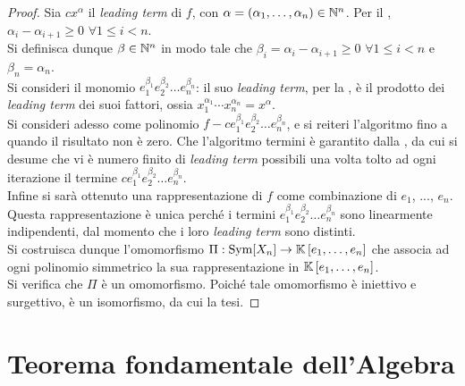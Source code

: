 \begin{proof}
    Sia $c x^\alpha$ il \textit{leading term} di $f$, con
    $\alpha = (\alpha_1, \ldots, \alpha_n) \in \mathbb N^n$.
    Per il ,
    $\alpha_i - \alpha_{i+1} \geq 0$ $\forall 1 \leq i < n$. \\
    
    Si definisca dunque $\beta \in \mathbb N^n$ in modo tale
    che $\beta_i = \alpha_i - \alpha_{i+1} \geq 0$ $\forall 1 \leq i < n$
    e $\beta_n = \alpha_n$. \\
    
    Si consideri il monomio $e_1^{\beta_1} e_2^{\beta_2} \ldots e_n^{\beta_n}$:
    il suo \textit{leading term}, per la ,
    è il prodotto dei \textit{leading term} dei suoi fattori,
    ossia $x_1^{\alpha_1} \cdots x_n^{\alpha_n} = x^\alpha$. \\
    
    Si consideri adesso come polinomio $f - c e_1^{\beta_1} e_2^{\beta_2} \ldots e_n^{\beta_n}$,
    e si reiteri l'algoritmo fino a quando il risultato non è zero. Che l'algoritmo
    termini è garantito dalla , da cui
    si desume che vi è numero finito di \textit{leading term} possibili una
    volta tolto ad ogni iterazione il termine $c e_1^{\beta_1} e_2^{\beta_2} \ldots e_n^{\beta_n}$. \\
    
    Infine si sarà ottenuto una rappresentazione di $f$ come combinazione di
    $e_1$, ..., $e_n$. Questa rappresentazione è unica perché
    i termini $e_1^{\beta_1} e_2^{\beta_2} \ldots e_n^{\beta_n}$ sono
    linearmente indipendenti, dal momento che i loro
    \textit{leading term} sono distinti. \\
    
    Si costruisca dunque l'omomorfismo $\Pi : \operatorname{Sym}[X_n] \to \mathbb{K}\left[e_1, \ldots, e_n\right]$
    che associa ad ogni polinomio simmetrico la sua rappresentazione in
    $\mathbb{K}\left[e_1, \ldots, e_n\right]$. \\
    
    Si verifica che $\Pi$ è un omomorfismo. Poiché tale omomorfismo è iniettivo
    e surgettivo, è un isomorfismo, da cui la tesi.
\end{proof}

\section{Teorema fondamentale dell'Algebra}


